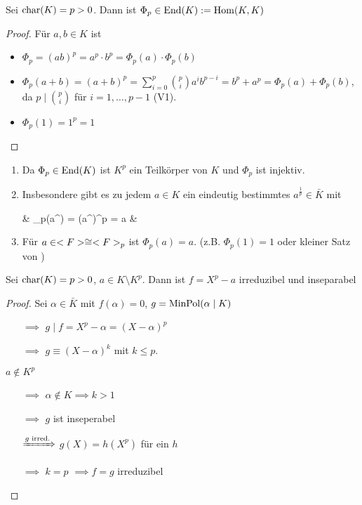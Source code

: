 \begin{proposition}
	Sei $\operatorname{char}(K) = p > 0$. Dann ist $\Phi_p \in \operatorname{End}(K): =\operatorname{Hom}(K,K)$
\end{proposition}
\begin{proof}
	Für $a, b \in K$ ist
	\begin{itemize}[topsep=-6pt]
		\item $\Phi_p = (ab)^p = a^p \cdot b^p = \Phi_p (a) \cdot \Phi_p(b)$
		\item $\Phi_p(a+b) = (a+b)^p = \sum_{i=0}^p\binom{p}{i} a^i b^{p-i} = b^p + a^p = \Phi_p(a) + \Phi_p(b)$, da $p \mid \binom{p}{i}$ für $i = 1, \dots, p-1$ (V1).
		\item $\Phi_p(1) = 1^p = 1$
	\end{itemize}
\end{proof}
\begin{remark}
	\begin{enumerate}[label={(\alph*)}]
		\item Da $\Phi_p \in \operatorname{End}(K) $ ist $K^p$ ein Teilkörper von $K$ und $\Phi_p$ ist injektiv.
		\item Insbesondere gibt es zu jedem $a \in K$ ein eindeutig bestimmtes $a^{\frac{1}{p}} \in \bar{K}$ mit
		\begin{flalign*}
			\qquad & \Phi_p\Big(a^{}\Big) = \Big(a^{}\Big)^p = a &
		\end{flalign*}
		\item Für $a \in <F> \cong <F>_p$ ist $\Phi_p(a) = a$. (z.B. $\Phi_p(1) = 1$ oder kleiner Satz von )
	\end{enumerate}
\end{remark}
\begin{lemma}
	Sei $\operatorname{char}(K) = p > 0$, $a \in K \setminus K^p$. Dann ist $f = X^p -a$ irreduzibel und inseparabel
\end{lemma}
\begin{proof}
	Sei $\alpha \in \bar{K}$ mit $f(\alpha) = 0$, $g= \operatorname{MinPol}(\alpha \mid K)$
	\begin{itemize}[topsep=-6pt]
	\item[$\implies$] $g \mid f = X^p - \alpha = (X-\alpha)^p$
	\item[$\implies$] $g \equiv (X - \alpha)^k$ mit $k \le p$. 
	\end{itemize}
	\medskip
	$a \notin K^p$
	\begin{itemize}[topsep=-6pt,widest=$\xRightarrow{g \text{ irred.}}$,leftmargin=*]
	\item [$\implies$] $\alpha \notin K \implies k >1$
	\item[$\implies$] $g$ ist inseperabel
	\item[$\xRightarrow{g \text{ irred.}}$] $g(X) = h(X^p)$ für ein $h$
	\item[$\implies$] $k = p$ $\implies f = g$ irreduzibel 
	\end{itemize}
\end{proof}